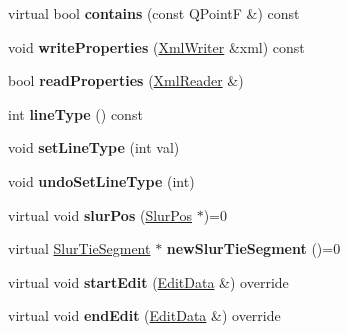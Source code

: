 \begin{DoxyCompactItemize}
\mbox{\label{class_ms_1_1_slur_tie_a435fdebce38994a2b4aac60b63dd8639}} 
virtual bool {\bfseries contains} (const Q\+PointF \&) const
\item 
\mbox{\label{class_ms_1_1_slur_tie_a9a6fc41a968a3352d12ca389cf07b9cc}} 
void {\bfseries write\+Properties} (\hyperlink{class_ms_1_1_xml_writer}{Xml\+Writer} \&xml) const
\item 
\mbox{\label{class_ms_1_1_slur_tie_a245a2f9c910c4ad77cfc0e6c4e37aad5}} 
bool {\bfseries read\+Properties} (\hyperlink{class_ms_1_1_xml_reader}{Xml\+Reader} \&)
\item 
\mbox{\label{class_ms_1_1_slur_tie_a965f86f8aba3689eb9e879acdda683c7}} 
int {\bfseries line\+Type} () const
\item 
\mbox{\label{class_ms_1_1_slur_tie_a3ad6a7cab613c74ca8ac3a7582192c41}} 
void {\bfseries set\+Line\+Type} (int val)
\item 
\mbox{\label{class_ms_1_1_slur_tie_a49204847f7d6a4d2f2711a16ed561e3c}} 
void {\bfseries undo\+Set\+Line\+Type} (int)
\item 
\mbox{\label{class_ms_1_1_slur_tie_aac9ed9abf33d52bd6daa16ff6289a89d}} 
virtual void {\bfseries slur\+Pos} (\hyperlink{struct_ms_1_1_slur_pos}{Slur\+Pos} $\ast$)=0
\item 
\mbox{\label{class_ms_1_1_slur_tie_a94106ff8a527cfd07258b9b7aa80b760}} 
virtual \hyperlink{class_ms_1_1_slur_tie_segment}{Slur\+Tie\+Segment} $\ast$ {\bfseries new\+Slur\+Tie\+Segment} ()=0
\item 
\mbox{\label{class_ms_1_1_slur_tie_abea57ad787a6bdaa2e4f6fa3ff0c6823}} 
virtual void {\bfseries start\+Edit} (\hyperlink{class_ms_1_1_edit_data}{Edit\+Data} \&) override
\item 
\mbox{\label{class_ms_1_1_slur_tie_a71596c8a0c6803f63c88cd8355d2c5f7}} 
virtual void {\bfseries end\+Edit} (\hyperlink{class_ms_1_1_edit_data}{Edit\+Data} \&) override

\end{DoxyCompactItemize}
